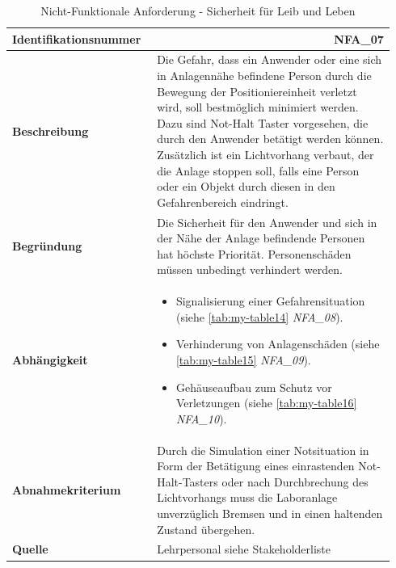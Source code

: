 \documentclass[../../../Bachelorarbeit.tex]{subfiles}
\begin{document}
\begin{table}[H]
    \centering
    \begin{tabular}{ p{0.34\linewidth}  p{0.6\linewidth} }
        \hline
        \textbf{Identifikationsnummer}  & \multicolumn{1}{r}{NFA\_07} \\ \hline
        \textbf{Beschreibung}           & Die Gefahr, dass ein Anwender oder eine sich in Anlagennähe befindene Person durch die Bewegung der Positioniereinheit verletzt wird, soll bestmöglich minimiert werden. Dazu sind Not-Halt Taster vorgesehen, die durch den Anwender betätigt werden können. Zusätzlich ist ein Lichtvorhang verbaut, der die Anlage stoppen soll, falls eine Person oder ein Objekt durch diesen in den Gefahrenbereich eindringt. \\
        \textbf{Begründung}             & Die Sicherheit für den Anwender und sich in der Nähe der Anlage befindende Personen hat höchste Priorität. Personenschäden müssen unbedingt verhindert werden. \\
        \textbf{Abhängigkeit}           &   {\begin{itemize}[noitemsep,topsep=0pt,parsep=0pt,partopsep=0pt,leftmargin=*]
                                                \item Signalisierung einer Gefahrensituation (siehe \autoref{tab:my-table14} \textit{NFA\_08}).
                                                \item Verhinderung von Anlagenschäden (siehe \autoref{tab:my-table15} \textit{NFA\_09}).
                                                \item Gehäuseaufbau zum Schutz vor Verletzungen (siehe \autoref{tab:my-table16} \textit{NFA\_10}).
                                            \end{itemize}} \\
        \textbf{Abnahmekriterium}       & Durch die Simulation einer Notsituation in Form der Betätigung eines einrastenden Not-Halt-Tasters oder nach Durchbrechung des Lichtvorhangs muss die Laboranlage unverzüglich Bremsen und in einen haltenden Zustand übergehen. \\
        \textbf{Quelle}                 & Lehrpersonal siehe Stakeholderliste \\ \hline
    \end{tabular}
    \caption[\acs{nfa} - Sicherheit für Leib und Leben]{Nicht-Funktionale Anforderung - Sicherheit für Leib und Leben}
    \label{tab:my-table13}
\end{table}
\end{document}

